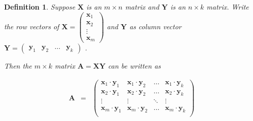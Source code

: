 \documentclass[handout]{beamer}
\newtheorem{defn}{Definition}
\numberwithin{equation}{section}
\begin{document}
\begin{frame}
\begin{defn} 
 Suppose $\boldsymbol{X}$ is an $m \times n$ matrix and $\boldsymbol{Y}$ is an $n \times k$ matrix. Write the row vectors of $\boldsymbol{X} = \begin{pmatrix} \boldsymbol{x}_{1} \\ \boldsymbol{x}_{2} \\ \vdots\\ \boldsymbol{x}_{m} \end{pmatrix} $ and $\boldsymbol{Y}$ as column vector $\boldsymbol{Y} = \begin{pmatrix} \boldsymbol{y}_{1} & \boldsymbol{y}_{2} & \hdots & \boldsymbol{y}_{k} \end{pmatrix}$ .  
 
Then the $m \times k$ matrix $\boldsymbol{A} = \boldsymbol{X} \boldsymbol{Y}$ can be written as 

\begin{eqnarray}
\boldsymbol{A} & = & \begin{pmatrix} \boldsymbol{x}_{1} \cdot \boldsymbol{y}_{1} & \boldsymbol{x}_{1} \cdot  \boldsymbol{y}_{2} & \hdots & \boldsymbol{x}_{1} \cdot  \boldsymbol{y}_{k}\\
\boldsymbol{x}_{2} \cdot  \boldsymbol{y}_{1} & \boldsymbol{x}_{2} \cdot  \boldsymbol{y}_{2} & \hdots & \boldsymbol{x}_{2}\cdot  \boldsymbol{y}_{k}\\
							\vdots & \vdots & \ddots & \vdots \\
				\boldsymbol{x}_{m} \cdot  \boldsymbol{y}_{1} & \boldsymbol{x}_{m} \cdot \boldsymbol{y}_{2} & \hdots & \boldsymbol{x}_{m} \cdot  \boldsymbol{y}_{k}\\
								\end{pmatrix}  \nonumber 			
\end{eqnarray}

\end{defn}

\end{frame}
\end{document}
